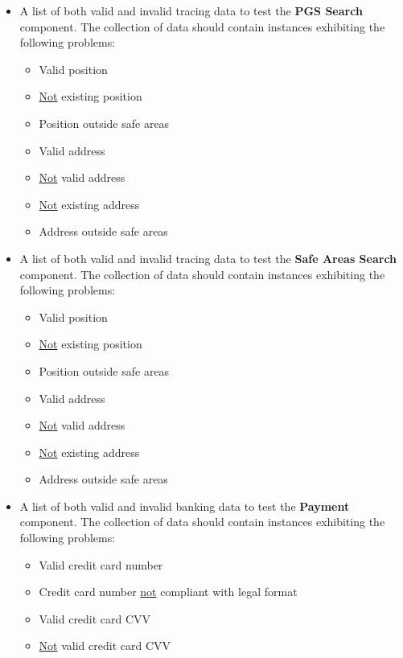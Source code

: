 \documentclass[english]{article}
\begin{document}
\begin{itemize}
    \item{A list of both valid and invalid tracing data to test the \textbf{PGS Search} component.
    The collection of data should contain instances exhibiting the following problems:
    \begin{itemize}
      \item{Valid position}
      \item{\underline{Not} existing position}
      \item{Position outside safe areas}
      \item{Valid address}
      \item{\underline{Not} valid address}
      \item{\underline{Not} existing address}
      \item{Address outside safe areas}
    \end{itemize}}

    \item{A list of both valid and invalid tracing data to test the \textbf{Safe Areas Search} component.
    The collection of data should contain instances exhibiting the following problems:
    \begin{itemize}
      \item{Valid position}
      \item{\underline{Not} existing position}
      \item{Position outside safe areas}
      \item{Valid address}
      \item{\underline{Not} valid address}
      \item{\underline{Not} existing address}
      \item{Address outside safe areas}
    \end{itemize}}

    \item{A list of both valid and invalid banking data to test the \textbf{Payment} component.
    The collection of data should contain instances exhibiting the following problems:
    \begin{itemize}
      \item{Valid credit card number}
      \item{Credit card number \underline{not} compliant with legal format}
      \item{Valid credit card CVV}
      \item{\underline{Not} valid credit card CVV}
    \end{itemize}}


\end{itemize}
\end{document}
